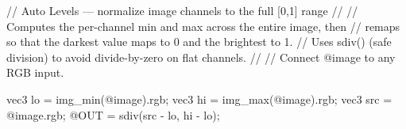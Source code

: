 // Auto Levels — normalize image channels to the full [0,1] range
//
// Computes the per-channel min and max across the entire image, then
// remaps so that the darkest value maps to 0 and the brightest to 1.
// Uses sdiv() (safe division) to avoid divide-by-zero on flat channels.
//
// Connect @image to any RGB input.

vec3 lo = img_min(@image).rgb;
vec3 hi = img_max(@image).rgb;
vec3 src = @image.rgb;
@OUT = sdiv(src - lo, hi - lo);